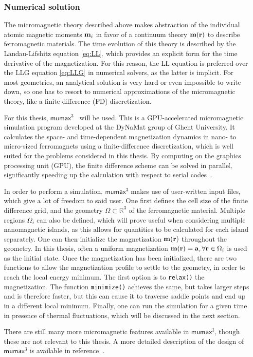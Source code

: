 \documentclass[11pt,a4paper,english,twoside]{article}
\newcommand{\code}[1]{\texttt{#1}}
\newcommand{\mumax}{$\mathsf{mumax}^3$}
\begin{document}
\subsubsection{Numerical solution}
The micromagnetic theory described above makes abstraction of the individual atomic magnetic moments $\vb{m}_i$ in favor of a continuum theory $\vb{m}(\vb{r})$ to describe ferromagnetic materials. The time evolution of this theory is described by the Landau-Lifshitz equation \eqref{eq:LL}, which provides an explicit form for the time derivative of the magnetization. For this reason, the LL equation is preferred over the LLG equation \eqref{eq:LLG} in numerical solvers, as the latter is implicit. For most geometries, an analytical solution is very hard or even impossible to write down, so one has to resort to numerical approximations of the micromagnetic theory, like a finite difference (FD) discretization. \par
For this thesis, \mumax{}~\cite{MuMax3} will be used. This is a GPU-accelerated micromagnetic simulation program developed at the DyNaMat group of Ghent University. It calculates the space- and time-dependent magnetization dynamics in nano- to micro-sized ferromagnets using a finite-difference discretization, which is well suited for the problems considered in this thesis. By computing on the graphics processing unit (GPU), the finite difference scheme can be solved in parallel, significantly speeding up the calculation with respect to serial codes~\cite{MicromagneticGPU}. \par
In order to perform a simulation, \mumax{} makes use of user-written input files, which give a lot of freedom to said user. One first defines the cell size of the finite difference grid, and the geometry $\Omega \subset \mathbb{R}^3$ of the ferromagnetic material. Multiple regions $\Omega_i$ can also be defined, which will prove useful when considering multiple nanomagnetic islands, as this allows for quantities to be calculated for each island separately. One can then initialize the magnetization $\vb{m}(\vb{r})$ throughout the geometry. In this thesis, often a uniform magnetization $\vb{m}(\vb{r}) = \vb{a}, \forall \vb{r} \in \Omega_i$ is used as the initial state. Once the magnetization has been initialized, there are two functions to allow the magnetization profile to settle to the geometry, in order to reach the local energy minimum. The first option is to \code{relax()} the magnetization. The function \code{minimize()} achieves the same, but takes larger steps and is therefore faster, but this can cause it to traverse saddle points and end up in a different local minimum. Finally, one can run the simulation for a given time in presence of thermal fluctuations, which will be discussed in the next section. \par
There are still many more micromagnetic features available in \mumax{}, though these are not relevant to this thesis. A more detailed description of the design of \mumax{} is available in reference~\cite{MuMax3}.
\end{document}
